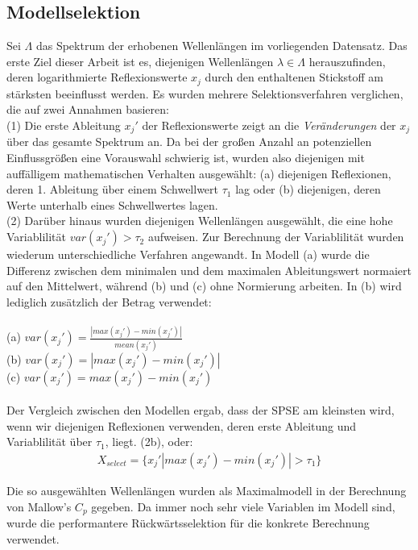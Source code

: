 	\subsection{Modellselektion}
	\label{ssec:modellselektion}
	Sei $\Lambda$ das Spektrum der erhobenen Wellenlängen im vorliegenden Datensatz.
	Das erste Ziel dieser Arbeit ist es, diejenigen Wellenlängen $\lambda\in\Lambda$ herauszufinden, deren logarithmierte Reflexionswerte $x_j$ durch den enthaltenen Stickstoff am stärksten beeinflusst werden.
	Es wurden mehrere Selektionsverfahren verglichen, die auf zwei Annahmen basieren: \\
	(1) Die erste Ableitung $x_j'$ der Reflexionswerte zeigt an die \textit{Veränderungen} der $x_j$ über das gesamte Spektrum an.
	Da bei der großen Anzahl an potenziellen Einflussgrößen eine Vorauswahl schwierig ist, wurden also diejenigen mit auffälligem mathematischen Verhalten ausgewählt: (a) diejenigen Reflexionen, deren 1. Ableitung über einem Schwellwert $\tau_1$ lag oder (b) diejenigen, deren Werte unterhalb eines Schwellwertes lagen.\\
	(2) Darüber hinaus wurden diejenigen Wellenlängen ausgewählt, die eine hohe Variablilität $var(x_j') > \tau_2$ aufweisen.
	Zur Berechnung der Variablilität wurden wiederum unterschiedliche Verfahren angewandt. In Modell (a) wurde die Differenz zwischen dem minimalen und dem maximalen Ableitungswert normaiert auf den Mittelwert, während (b) und (c) ohne Normierung arbeiten. In (b) wird lediglich zusätzlich der Betrag verwendet: 	\\ \\
	(a) $var(x_j') = \frac{|max(x_j') - min(x_j')|}{mean(x_j')}$\\
	(b) $var(x_j') = |max(x_j') - min(x_j')|$\\
	(c) $var(x_j')= max(x_j') - min(x_j')$\\ \\
	Der Vergleich zwischen den Modellen ergab, dass der SPSE am kleinsten wird, wenn wir diejenigen Reflexionen verwenden, deren erste Ableitung und Variablilität über $\tau_1$, liegt. (2b), oder:
	\begin{align*}
		X_{select} = \{x_j'|max(x_j') - min(x_j')| > \tau_1\}
	\end{align*}

	Die so ausgewählten Wellenlängen wurden als Maximalmodell in der Berechnung von Mallow's $C_p$ gegeben.
	Da immer noch sehr viele Variablen im Modell sind, wurde die performantere Rückwärtsselektion für die konkrete Berechnung verwendet.

